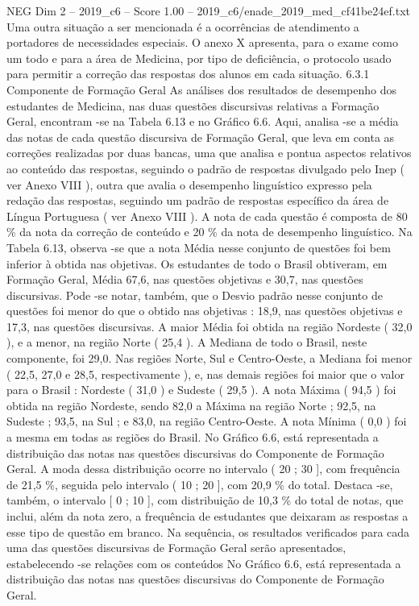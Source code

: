 \begin{textsample}{NEG Dim 2 – 2019\_c6 – Score 1.00 – 2019\_c6/enade\_2019\_med\_cf41be24ef.txt}
Uma outra situação a ser mencionada é a ocorrências de atendimento a portadores de necessidades especiais.
O anexo X apresenta, para o exame como um todo e para a área de Medicina, por tipo de deficiência, o protocolo usado para permitir a correção das respostas dos alunos em cada situação. 6.3.1 Componente de Formação Geral As análises dos resultados de desempenho dos estudantes de Medicina, nas duas questões discursivas relativas a Formação Geral, encontram -se na Tabela 6.13 e no Gráfico 6.6.
Aqui, analisa -se a média das notas de cada questão discursiva de Formação Geral, que leva em conta as correções realizadas por duas bancas, uma que analisa e pontua aspectos relativos ao conteúdo das respostas, seguindo o padrão de respostas divulgado pelo Inep ( ver Anexo VIII ), outra que avalia o desempenho linguístico expresso pela redação das respostas, seguindo um padrão de respostas específico da área de Língua Portuguesa ( ver Anexo VIII ).
A nota de cada questão é composta de 80 \% da nota da correção de conteúdo e 20 \% da nota de desempenho linguístico.
Na Tabela 6.13, observa -se que a nota Média nesse conjunto de questões foi bem inferior à obtida nas objetivas.
Os estudantes de todo o Brasil obtiveram, em Formação Geral, Média 67,6, nas questões objetivas e 30,7, nas questões discursivas.
Pode -se notar, também, que o Desvio padrão nesse conjunto de questões foi menor do que o obtido nas objetivas : 18,9, nas questões objetivas e 17,3, nas questões discursivas.
A maior Média foi obtida na região Nordeste ( 32,0 ), e a menor, na região Norte ( 25,4 ).
A Mediana de todo o Brasil, neste componente, foi 29,0.
Nas regiões Norte, Sul e Centro-Oeste, a Mediana foi menor ( 22,5, 27,0 e 28,5, respectivamente ), e, nas demais regiões foi maior que o valor para o Brasil : Nordeste ( 31,0 ) e Sudeste ( 29,5 ).
A nota Máxima ( 94,5 ) foi obtida na região Nordeste, sendo 82,0 a Máxima na região Norte ; 92,5, na Sudeste ; 93,5, na Sul ; e 83,0, na região Centro-Oeste.
A nota Mínima ( 0,0 ) foi a mesma em todas as regiões do Brasil.
No Gráfico 6.6, está representada a distribuição das notas nas questões discursivas do Componente de Formação Geral.
A moda dessa distribuição ocorre no intervalo ( 20 ; 30 ], com frequência de 21,5 \%, seguida pelo intervalo ( 10 ; 20 ], com 20,9 \% do total.
Destaca -se, também, o intervalo [ 0 ; 10 ], com distribuição de 10,3 \% do total de notas, que inclui, além da nota zero, a frequência de estudantes que deixaram as respostas a esse tipo de questão em branco.
Na sequência, os resultados verificados para cada uma das questões discursivas de Formação Geral serão apresentados, estabelecendo -se relações com os conteúdos No Gráfico 6.6, está representada a distribuição das notas nas questões discursivas do Componente de Formação Geral.

\end{textsample}
